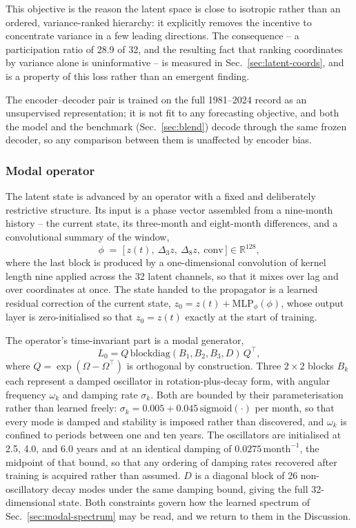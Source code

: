This objective is the reason the latent space is close to isotropic rather than an ordered,
variance-ranked hierarchy: it explicitly removes the incentive to concentrate variance in a
few leading directions. The consequence -- a participation ratio of 28.9 of 32, and the
resulting fact that ranking coordinates by variance alone is uninformative -- is measured in
Sec.~\ref{sec:latent-coords}, and is a property of this loss rather than an emergent finding.

The encoder--decoder pair is trained on the full 1981--2024 record as an unsupervised
representation; it is not fit to any forecasting objective, and both the model and the
benchmark (Sec.~\ref{sec:blend}) decode through the same frozen decoder, so any comparison
between them is unaffected by encoder bias.

\subsubsection{Modal operator}
\label{sec:operator}

The latent state is advanced by an operator with a fixed and deliberately restrictive
structure. Its input is a phase vector assembled from a nine-month history -- the current
state, its three-month and eight-month differences, and a convolutional summary of the window,
\[
\phi \;=\; \bigl[\,z(t),\ \Delta_3 z,\ \Delta_8 z,\ \mathrm{conv}\,\bigr] \in \mathbb{R}^{128},
\]
where the last block is produced by a one-dimensional convolution of kernel length nine applied
across the 32 latent channels, so that it mixes over lag and over coordinates at once. The
state handed to the propagator is a learned residual correction of the current state,
$z_0 = z(t) + \mathrm{MLP}_{\phi}(\phi)$, whose output layer is zero-initialised so that
$z_0 = z(t)$ exactly at the start of training.

The operator's time-invariant part is a modal generator,
\[
L_0 = Q\,\mathrm{blockdiag}(B_1,B_2,B_3,D)\,Q^{\top},
\]
where $Q=\exp(\Omega-\Omega^{\top})$ is orthogonal by construction. Three $2\times2$ blocks
$B_k$ each represent a damped oscillator in rotation-plus-decay form, with angular frequency
$\omega_k$ and damping rate $\sigma_k$. Both are bounded by their parameterisation rather than
learned freely: $\sigma_k = 0.005 + 0.045\,\mathrm{sigmoid}(\cdot)$ per month, so that every
mode is damped and stability is imposed rather than discovered, and $\omega_k$ is confined to
periods between one and ten years. The oscillators are initialised at 2.5, 4.0, and 6.0 years
and at an identical damping of $0.0275\,\mathrm{month}^{-1}$, the midpoint of that bound, so
that any ordering of damping rates recovered after training is acquired rather than assumed.
$D$ is a diagonal block of 26 non-oscillatory decay modes under the same damping bound, giving
the full 32-dimensional state. Both constraints govern how the
learned spectrum of Sec.~\ref{sec:modal-spectrum} may be read, and we return to them in the
Discussion.

